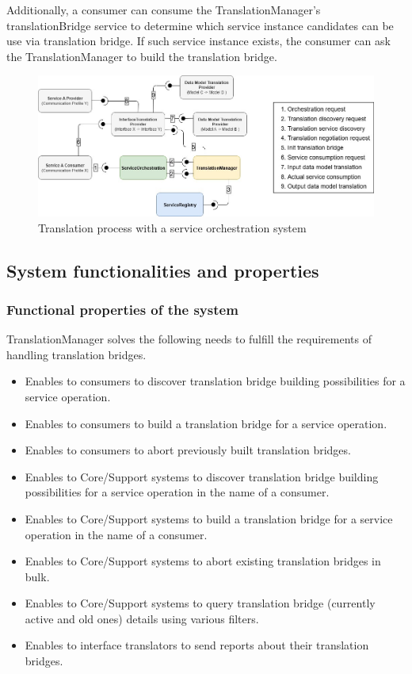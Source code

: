\documentclass[a4paper]{arrowhead}
\begin{document}
Additionally, a consumer can consume the TranslationManager's translationBridge service to determine which service instance candidates can be use via translation bridge. If such service instance exists, the consumer can ask the TranslationManager to build the translation bridge.

\begin{figure}[ht!]
  \centering
  \includegraphics[width=\textwidth]{figures/TranslatorManagerv5.jpg}
  \caption{Translation process with a service orchestration system}
  \label{fig:translation_process}
\end{figure}

\subsection{System functionalities and properties}
\label{sec:properties}

\subsubsection {Functional properties of the system}
TranslationManager solves the following needs to fulfill the requirements of handling translation bridges.

\begin{itemize}
    \item Enables to consumers to discover translation bridge building possibilities for a service operation.
    \item Enables to consumers to build a translation bridge for a service operation.
    \item Enables to consumers to abort previously built translation bridges.
    \item Enables to Core/Support systems to discover translation bridge building possibilities for a service operation in the name of a consumer.
    \item Enables to Core/Support systems to build a translation bridge for a service operation in the name of a consumer.
    \item Enables to Core/Support systems to abort existing translation bridges in bulk.
    \item Enables to Core/Support systems to query translation bridge (currently active and old ones) details using various filters.
    \item Enables to interface translators to send reports about their translation bridges.
\end{itemize}
\end{document}
